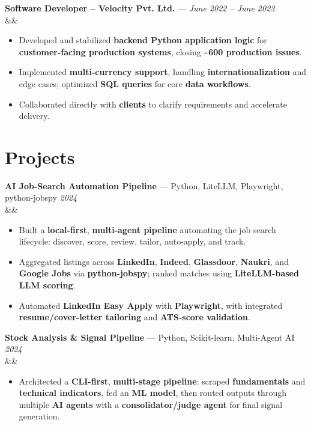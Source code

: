 \documentclass[a4paper,9pt]{extarticle}
\newcommand{\resumeItem}[1]{\item\small{#1}}
\newenvironment{resumeItemList}
  {\begin{itemize}[leftmargin=1.1em,labelsep=0.45em,topsep=1pt,parsep=0pt,itemsep=2pt,label=$\circ$]}
  {\end{itemize}\vspace{-1pt}}
\newcommand{\roleHeading}[4]{%
  \vspace{3pt}%
  \textbf{#1} --- #2 \hfill \textit{#3}\\[1pt]%
  \ifx&#4&\else \textit{\small #4}\\[1pt]\fi
}
\begin{document}
\roleHeading{Software Developer -- Velocity Pvt. Ltd.}{}{June 2022 -- June 2023}{}
\begin{resumeItemList}
  \resumeItem{Developed and stabilized \textbf{backend Python application logic} for \textbf{customer-facing production systems}, closing \textbf{\textasciitilde600 production issues}.}
  \resumeItem{Implemented \textbf{multi-currency support}, handling \textbf{internationalization} and edge cases; optimized \textbf{SQL queries} for core \textbf{data workflows}.}
  \resumeItem{Collaborated directly with \textbf{clients} to clarify requirements and accelerate delivery.}
\end{resumeItemList}

\section{Projects}

\roleHeading{AI Job-Search Automation Pipeline}{Python, LiteLLM, Playwright, python-jobspy}{2024}{}
\begin{resumeItemList}
  \resumeItem{Built a \textbf{local-first}, \textbf{multi-agent pipeline} automating the job search lifecycle: discover, score, review, tailor, auto-apply, and track.}
  \resumeItem{Aggregated listings across \textbf{LinkedIn}, \textbf{Indeed}, \textbf{Glassdoor}, \textbf{Naukri}, and \textbf{Google Jobs} via \textbf{python-jobspy}; ranked matches using \textbf{LiteLLM-based LLM scoring}.}
  \resumeItem{Automated \textbf{LinkedIn Easy Apply} with \textbf{Playwright}, with integrated \textbf{resume/cover-letter tailoring} and \textbf{ATS-score validation}.}
\end{resumeItemList}

\roleHeading{Stock Analysis \& Signal Pipeline}{Python, Scikit-learn, Multi-Agent AI}{2024}{}
\begin{resumeItemList}
  \resumeItem{Architected a \textbf{CLI-first}, \textbf{multi-stage pipeline}: scraped \textbf{fundamentals} and \textbf{technical indicators}, fed an \textbf{ML model}, then routed outputs through multiple \textbf{AI agents} with a \textbf{consolidator/judge agent} for final signal generation.}
\end{resumeItemList}

\end{document}
